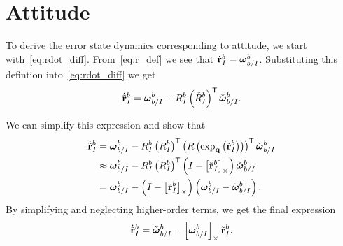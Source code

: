 

\section{Attitude}

To derive the error state dynamics corresponding to attitude, we start
with~\eqref{eq:rdot_diff}. From~\eqref{eq:r_def} we see that $\dot{\boldsymbol{\mathrm{r}}}_I^b
= \boldsymbol{\mathrm{\omega}}_{b/I}^b$. Substituting this defintion into~\eqref{eq:rdot_diff}
we get
\begin{equation}
\dot{\tilde{\boldsymbol{\mathrm{r}}}}_I^b = \boldsymbol{\mathrm{\omega}}_{b/I}^{b} -
R_I^b\left(\check{R}_I^b\right)^{\mathsf{T}} \check{\boldsymbol{\mathrm{\omega}}}_{b/I}^{b}.
\end{equation}

We can simplify this expression and show that
\begin{align}
  \dot{\tilde{\boldsymbol{\mathrm{r}}}}_I^b &= \boldsymbol{\mathrm{\omega}}_{b/I}^{b} -
  R_I^b 
  \left(R_{I}^{b}\right)^{\mathsf{T}}
  \left(R\left(\exp_{\boldsymbol{\mathrm{q}}}\left(\tilde{\boldsymbol{\mathrm{r}}}_{I}^{b}\right)\right)\right)^{\mathsf{T}}
  \check{\boldsymbol{\mathrm{\omega}}}_{b/I}^{b} \\
  &\approx \boldsymbol{\mathrm{\omega}}_{b/I}^{b} -
  R_I^b \left(R_{I}^{b}\right)^{\mathsf{T}} \left( I - \left[ \tilde{\boldsymbol{\mathrm{r}}}_I^b \right]_{\times}
  \right) \check{\boldsymbol{\mathrm{\omega}}}_{b/I}^{b} \\
  &= \boldsymbol{\mathrm{\omega}}_{b/I}^{b} -
  \left( I - \left[ \tilde{\boldsymbol{\mathrm{r}}}_I^b \right]_{\times}
  \right) \left(\boldsymbol{\mathrm{\omega}}_{b/I}^{b} - \tilde{\boldsymbol{\mathrm{\omega}}}_{b/I}^{b}\right).
\end{align}
By simplifying and neglecting higher-order terms, we get the final expression
\begin{equation}
  \dot{\tilde{\boldsymbol{\mathrm{r}}}}_I^b = \tilde{\boldsymbol{\mathrm{\omega}}}_{b/I}^{b} -
  \left[ \boldsymbol{\mathrm{\omega}}_{b/I}^{b}  \right]_{\times} \tilde{\boldsymbol{\mathrm{r}}}_I^b.
\end{equation}


